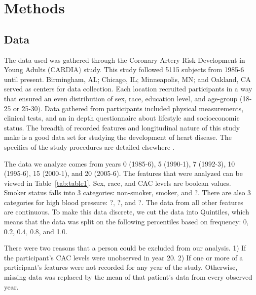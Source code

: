 \section{Methods}

\subsection{Data}

The data used was gathered through the Coronary Artery Risk Development in Young Adults (CARDIA) study. This study followed 5115 subjects from 1985-6 until present. Birmingham, AL; Chicago, IL; Minneapolis, MN; and Oakland, CA served as centers for data collection. Each location recruited participants in a way that ensured an even distribution of sex, race, education level, and age-group (18-25 or 25-30). Data gathered from participants included physical measurements, clinical tests, and an in depth questionnaire about lifestyle and socioeconomic status. The breadth of recorded features and longitudinal nature of this study make is a good data set for studying the development of heart disease. The specifics of the study procedures are detailed elsewhere \cite{Friedman1988}.

The data we analyze comes from years 0 (1985-6), 5 (1990-1), 7 (1992-3), 10 (1995-6), 15 (2000-1), and 20 (2005-6). The features that were analyzed can be viewed in Table~\ref{tab:table1}. Sex, race, and CAC levels are boolean values. Smoker status falls into 3 categories: non-smoker, smoker, and ?. There are also 3 categories for high blood pressure: ?, ?, and ?. The data from all other features are continuous. To make this data discrete, we cut the data into Quintiles, which means that the data was split on the following percentiles based on frequency: 0, 0.2, 0.4, 0.8, and 1.0.

There were two reasons that a person could be excluded from our analysis. 1) If the participant's CAC levels were unobserved in year 20. 2) If one or more of a participant's features were not recorded for any year of the study. Otherwise, missing data was replaced by the mean of that patient's data from every observed year. 


